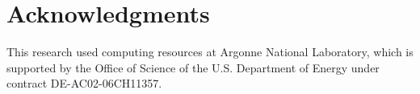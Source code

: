
\section*{Acknowledgments}

This research used computing resources 
at Argonne National Laboratory, which is supported by the Office of Science 
of the U.S. Department of Energy under contract DE-AC02-06CH11357.


